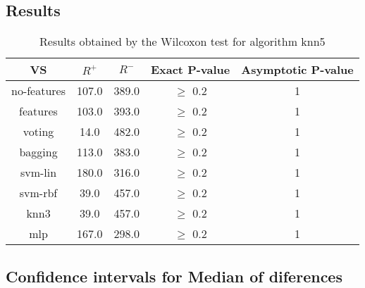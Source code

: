 \documentclass[a4paper,10pt]{article}
\begin{document}
\subsection{Results}

\begin{table}[!htp]
\centering\small
\begin{tabular}{
|c|c|c|c|c|}
\hline
 VS & $R^{+}$ & $R^{-}$ & Exact P-value & Asymptotic P-value \\ \hline 
no-features & 107.0 & 389.0 & $\geq$ 0.2 & 1\\ \hline 
features & 103.0 & 393.0 & $\geq$ 0.2 & 1\\ \hline 
voting & 14.0 & 482.0 & $\geq$ 0.2 & 1\\ \hline 
bagging & 113.0 & 383.0 & $\geq$ 0.2 & 1\\ \hline 
svm-lin & 180.0 & 316.0 & $\geq$ 0.2 & 1\\ \hline 
svm-rbf & 39.0 & 457.0 & $\geq$ 0.2 & 1\\ \hline 
knn3 & 39.0 & 457.0 & $\geq$ 0.2 & 1\\ \hline 
mlp & 167.0 & 298.0 & $\geq$ 0.2 & 1\\ \hline 

\end{tabular}
\caption{Results obtained by the Wilcoxon test for algorithm knn5}
\end{table}

\subsection{Confidence intervals for Median of diferences}
\end{document}
